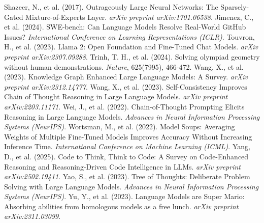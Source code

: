 \documentclass{article}
\begin{document}
\begin{thebibliography}{99}
Shazeer, N., et al. (2017). Outrageously Large Neural Networks: The Sparsely-Gated Mixture-of-Experts Layer. \textit{arXiv preprint arXiv:1701.06538}.
Jimenez, C., et al. (2024). SWE-bench: Can Language Models Resolve Real-World GitHub Issues? \textit{International Conference on Learning Representations (ICLR)}.
Touvron, H., et al. (2023). Llama 2: Open Foundation and Fine-Tuned Chat Models. \textit{arXiv preprint arXiv:2307.09288}.
Trinh, T. H., et al. (2024). Solving olympiad geometry without human demonstrations. \textit{Nature}, 625(7995), 466-472.
Wang, X., et al. (2023). Knowledge Graph Enhanced Large Language Models: A Survey. \textit{arXiv preprint arXiv:2312.14777}.
Wang, X., et al. (2023). Self-Consistency Improves Chain of Thought Reasoning in Large Language Models. \textit{arXiv preprint arXiv:2203.11171}.
Wei, J., et al. (2022). Chain-of-Thought Prompting Elicits Reasoning in Large Language Models. \textit{Advances in Neural Information Processing Systems (NeurIPS)}.
Wortsman, M., et al. (2022). Model Soups: Averaging Weights of Multiple Fine-Tuned Models Improves Accuracy Without Increasing Inference Time. \textit{International Conference on Machine Learning (ICML)}.
Yang, D., et al. (2025). Code to Think, Think to Code: A Survey on Code-Enhanced Reasoning and Reasoning-Driven Code Intelligence in LLMs. \textit{arXiv preprint arXiv:2502.19411}.
Yao, S., et al. (2023). Tree of Thoughts: Deliberate Problem Solving with Large Language Models. \textit{Advances in Neural Information Processing Systems (NeurIPS)}.
Yu, Y., et al. (2023). Language Models are Super Mario: Absorbing abilities from homologous models as a free lunch. \textit{arXiv preprint arXiv:2311.03099}.
\end{thebibliography}
\end{document}
